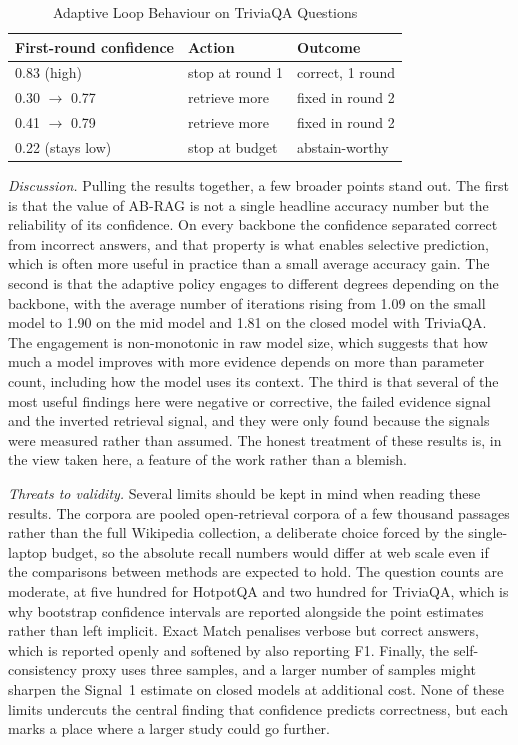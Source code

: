 \documentclass[conference,a4paper,10pt]{IEEEtran}
\begin{document}
\begin{table}[t]
\centering
\caption{Adaptive Loop Behaviour on TriviaQA Questions}
\label{tab:adaptive}
\renewcommand{\arraystretch}{1.2}
\begin{tabular}{lll}
\toprule
\textbf{First-round confidence} & \textbf{Action} & \textbf{Outcome} \\
\midrule
0.83 (high) & stop at round 1 & correct, 1 round \\
0.30 $\rightarrow$ 0.77 & retrieve more & fixed in round 2 \\
0.41 $\rightarrow$ 0.79 & retrieve more & fixed in round 2 \\
0.22 (stays low) & stop at budget & abstain-worthy \\
\bottomrule
\end{tabular}
\end{table}

\textit{Discussion.}
Pulling the results together, a few broader points stand out. The first is that the value
of AB-RAG is not a single headline accuracy number but the reliability of its confidence.
On every backbone the confidence separated correct from incorrect answers, and that
property is what enables selective prediction, which is often more useful in practice than
a small average accuracy gain. The second is that the adaptive policy engages to different
degrees depending on the backbone, with the average number of iterations rising from 1.09
on the small model to 1.90 on the mid model and 1.81 on the closed model with TriviaQA.
The engagement is non-monotonic in raw model size, which suggests that how much a model
improves with more evidence depends on more than parameter count, including how the model
uses its context. The third is that several of the most useful findings here were negative
or corrective, the failed evidence signal and the inverted retrieval signal, and they were
only found because the signals were measured rather than assumed. The honest treatment of
these results is, in the view taken here, a feature of the work rather than a blemish.

\textit{Threats to validity.}
Several limits should be kept in mind when reading these results. The corpora are pooled
open-retrieval corpora of a few thousand passages rather than the full Wikipedia
collection, a deliberate choice forced by the single-laptop budget, so the absolute recall
numbers would differ at web scale even if the comparisons between methods are expected to
hold. The question counts are moderate, at five hundred for HotpotQA and two hundred for
TriviaQA, which is why bootstrap confidence intervals are reported alongside the point
estimates rather than left implicit. Exact Match penalises verbose but correct answers,
which is reported openly and softened by also reporting F1. Finally, the self-consistency
proxy uses three samples, and a larger number of samples might sharpen the Signal~1
estimate on closed models at additional cost. None of these limits undercuts the central
finding that confidence predicts correctness, but each marks a place where a larger study
could go further.
\end{document}
